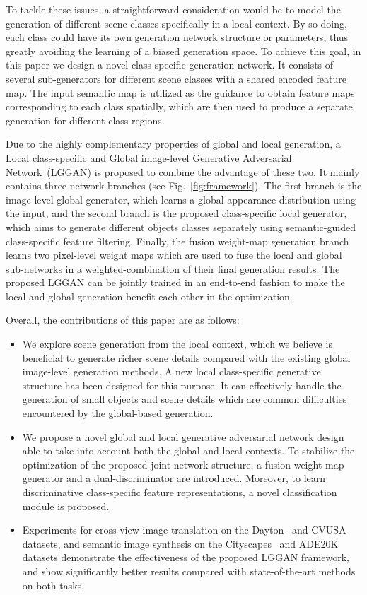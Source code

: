 \documentclass[10pt,twocolumn,letterpaper]{article}
\begin{document}
\par To tackle these issues, a straightforward consideration would be to model the generation of different scene classes specifically in a local context. By so doing, each class could have its own generation network structure or parameters, thus greatly avoiding the learning of a biased generation space. To achieve this goal, in this paper we design a novel class-specific generation network. It consists of several sub-generators for different scene classes with a shared encoded feature map. The input semantic map is utilized as the guidance to obtain feature maps corresponding to each class spatially, which are then used to produce a separate generation for different class regions.  

\par Due to the highly complementary properties of global and local generation, a Local class-specific and Global image-level Generative Adversarial Network~(LGGAN) is proposed to combine the advantage of these two. It mainly contains three network branches (see Fig.~\ref{fig:framework}). The first branch is the image-level global generator, which learns a global appearance distribution using the input, and the second branch is the proposed class-specific local generator, which aims to generate different objects classes separately using semantic-guided class-specific feature filtering. Finally, the fusion weight-map generation branch learns two pixel-level weight maps which are used to fuse the local and global sub-networks in a weighted-combination of their final generation results. The proposed LGGAN can be jointly trained in an end-to-end fashion to make the local and global generation benefit each other in the optimization. 



Overall, the contributions of this paper are as follows:
\begin{itemize}[leftmargin=*]
	\item We explore scene generation from the local context, which we believe is beneficial to generate richer scene details compared with the existing global image-level generation methods. A new local class-specific generative structure has been designed for this purpose. It can effectively handle the generation of small objects and scene details which are common difficulties encountered by the global-based generation.
	\item We propose a novel global and local generative adversarial network design able to take into account both the global and local contexts. To stabilize the optimization of the proposed joint network structure, a fusion weight-map generator and a dual-discriminator are introduced. Moreover, to learn discriminative class-specific feature representations, a novel classification module is proposed.
	\item Experiments for cross-view image translation on the Dayton~\cite{vo2016localizing} and CVUSA~\cite{workman2015wide} datasets,
and semantic image synthesis on the Cityscapes~\cite{cordts2016cityscapes} and ADE20K~\cite{zhou2017scene} datasets demonstrate the effectiveness of the proposed LGGAN framework, and show significantly better results compared with state-of-the-art methods on both tasks. 
\end{itemize}
\end{document}
